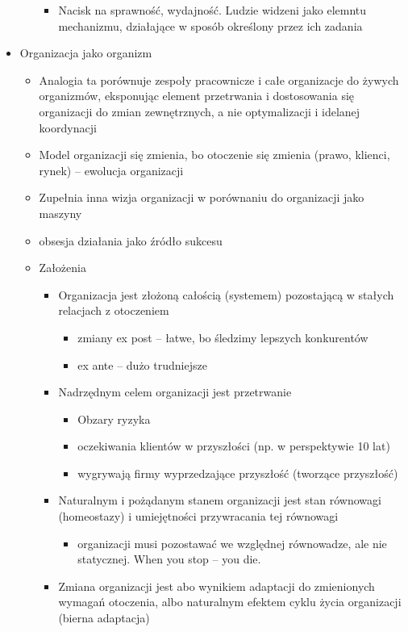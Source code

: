 \documentclass[a4paper,10pt]{report}
\begin{document}
\begin{itemize}
\begin{itemize}
\begin{itemize}
			\item Nacisk na sprawność, wydajność. Ludzie widzeni jako elemntu mechanizmu, działające w sposób określony przez ich zadania
		\end{itemize}
	\end{itemize}
	\item Organizacja jako organizm
	\begin{itemize}
		\item Analogia ta porównuje zespoły pracownicze i całe organizacje do żywych organizmów, eksponując element przetrwania i dostosowania się organizacji do zmian zewnętrznych, a nie optymalizacji i idelanej koordynacji
		\item Model organizacji się zmienia, bo otoczenie się zmienia (prawo, klienci, rynek) -- ewolucja organizacji
		\item Zupełnia inna wizja organizacji w porównaniu do organizacji jako maszyny
		\item obsesja działania jako źródło sukcesu
		\item Założenia
		\begin{itemize}
			\item Organizacja jest złożoną całością (systemem) pozostającą w stałych relacjach z otoczeniem
			\begin{itemize}
				\item zmiany ex post -- łatwe, bo śledzimy lepszych konkurentów
				\item ex ante -- dużo trudniejsze
			\end{itemize}
			\item Nadrzędnym celem organizacji jest przetrwanie
			\begin{itemize}
				\item Obzary ryzyka
				\item oczekiwania klientów w przyszłości (np. w perspektywie 10 lat)
				\item wygrywają firmy wyprzedzające przyszłość (tworzące przyszłość)
			\end{itemize}
			\item Naturalnym i pożądanym stanem organizacji jest stan równowagi (homeostazy) i umiejętności przywracania tej równowagi
			\begin{itemize}
				\item organizacji musi pozostawać we względnej równowadze, ale nie statycznej. When you stop -- you die.
			\end{itemize}
			\item Zmiana organizacji jest abo wynikiem adaptacji do zmienionych wymagań otoczenia, albo naturalnym efektem cyklu życia organizacji (bierna adaptacja)

\end{itemize}
\end{itemize}
\end{itemize}
\end{document}
